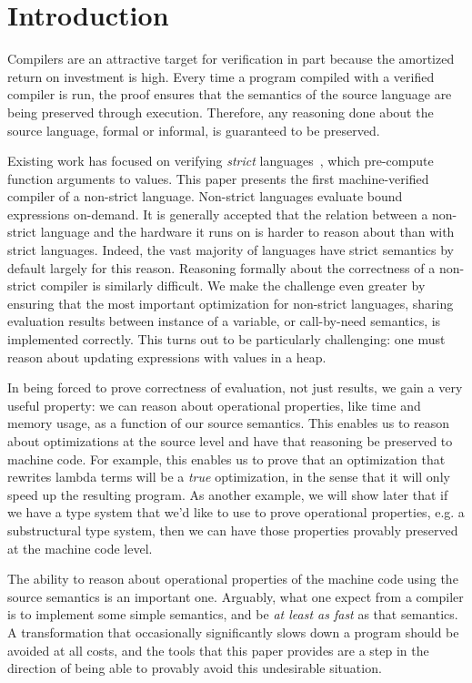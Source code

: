 \section{Introduction}
Compilers are an attractive target for verification in part because the
amortized return on investment is high. Every time a program compiled with a
verified compiler is run, the proof ensures that the semantics of the source
language are being preserved through execution. Therefore, any reasoning done
about the source language, formal or informal, is guaranteed to be preserved. 

Existing work has focused on verifying \emph{strict}
languages~\cite{chlipala2007certified, leroy2012compcert}, which pre-compute
function arguments to values. This paper presents the first machine-verified
compiler of a non-strict language. Non-strict languages evaluate bound
expressions on-demand. It is generally accepted that the relation between a
non-strict language and the hardware it runs on is harder to reason about than
with strict languages.  Indeed, the vast majority of languages have strict
semantics by default largely for this reason. Reasoning formally about the
correctness of a non-strict compiler is similarly difficult. We make the
challenge even greater by ensuring that the most important optimization for
non-strict languages, sharing evaluation results between instance of a variable,
or call-by-need semantics, is implemented correctly. This turns out to be
particularly challenging: one must reason about updating expressions with values
in a heap. 

In being forced to prove correctness of evaluation, not just results, we gain a
very useful property: we can reason about operational properties, like time and
memory usage, as a function of our source semantics. This enables us to reason
about optimizations at the source level and have that reasoning be preserved to
machine code. For example, this enables us to prove that an optimization that
rewrites lambda terms will be a \emph{true} optimization, in the sense that it
will only speed up the resulting program. As another example, we will show later
that if we have a type system that we'd like to use to prove operational
properties, e.g. a substructural type system, then we can have those properties
provably preserved at the machine code level. 

The ability to reason about operational properties of the machine code using the
source semantics is an important one. Arguably, what one expect from a compiler
is to implement some simple semantics, and be \emph{at least as fast} as that
semantics. A transformation that occasionally significantly slows down a program
should be avoided at all costs, and the tools that this paper provides are a
step in the direction of being able to provably avoid this undesirable
situation.

